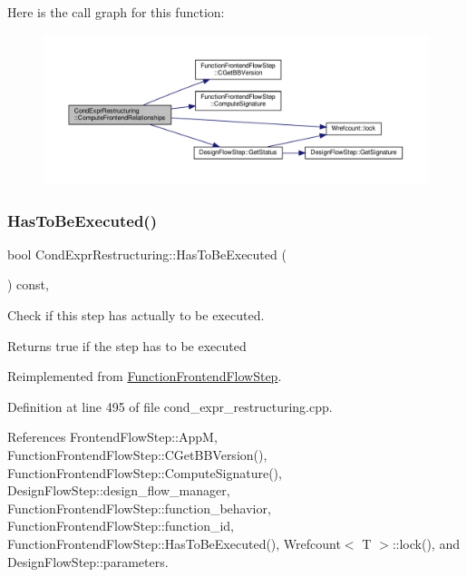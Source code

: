 Here is the call graph for this function\+:
\nopagebreak
\begin{figure}[H]
\begin{center}
\leavevmode
\includegraphics[width=350pt]{dd/d33/classCondExprRestructuring_a837db1066d7025261bde7b43ae4c7f86_cgraph}
\end{center}
\end{figure}
\mbox{\label{classCondExprRestructuring_a4442cdaca3a1345d45f17912918f1392}} 
\subsubsection{\texorpdfstring{Has\+To\+Be\+Executed()}{HasToBeExecuted()}}
{\footnotesize\ttfamily bool Cond\+Expr\+Restructuring\+::\+Has\+To\+Be\+Executed (\begin{DoxyParamCaption}{ }\end{DoxyParamCaption}) const\hspace{0.3cm}{\ttfamily [override]}, {\ttfamily [virtual]}}



Check if this step has actually to be executed. 

\begin{DoxyReturn}{Returns}
true if the step has to be executed 
\end{DoxyReturn}


Reimplemented from \hyperlink{classFunctionFrontendFlowStep_a12e786363530aa9533e4bd9380130d75}{Function\+Frontend\+Flow\+Step}.



Definition at line 495 of file cond\+\_\+expr\+\_\+restructuring.\+cpp.



References Frontend\+Flow\+Step\+::\+AppM, Function\+Frontend\+Flow\+Step\+::\+C\+Get\+B\+B\+Version(), Function\+Frontend\+Flow\+Step\+::\+Compute\+Signature(), Design\+Flow\+Step\+::design\+\_\+flow\+\_\+manager, Function\+Frontend\+Flow\+Step\+::function\+\_\+behavior, Function\+Frontend\+Flow\+Step\+::function\+\_\+id, Function\+Frontend\+Flow\+Step\+::\+Has\+To\+Be\+Executed(), Wrefcount$<$ T $>$\+::lock(), and Design\+Flow\+Step\+::parameters.

